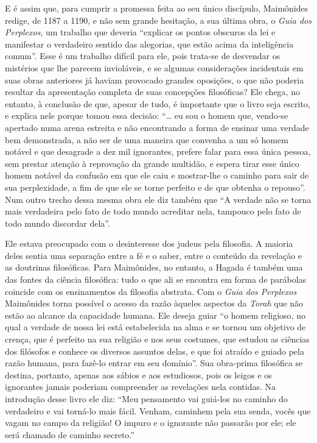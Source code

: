 E é assim que, para cumprir a promessa feita ao seu único discípulo,
Maimônides redige, de 1187 a 1190, e não sem grande hesitação, a sua
última obra, o \emph{Guia dos Perplexos}, um trabalho que deveria
``explicar os pontos obscuros da lei e manifestar o verdadeiro sentido
das alegorias, que estão acima da inteligência comum''. Esse é um
trabalho difícil para ele, pois trata-se de desvendar os mistérios que
lhe parecem invioláveis, e se algumas considerações incidentais em suas
obras anteriores já haviam provocado grandes oposições, o que não
poderia resultar da apresentação completa de suas concepções
filosóficas? Ele chega, no entanto, à conclusão de que, apesar de tudo,
é importante que o livro seja escrito, e explica nele porque tomou essa
decisão: ``\ldots{} eu sou o homem que, vendo-se apertado numa arena estreita
e não encontrando a forma de ensinar uma verdade bem demonstrada, a não
ser de uma maneira que convenha a um só homem notável e que desagrade a
dez mil ignorantes, prefere falar para essa única pessoa, sem prestar
atenção à reprovação da grande multidão, e espera tirar esse único
homem notável da confusão em que ele caiu e mostrar-lhe o caminho para
sair de sua perplexidade, a fim de que ele se torne perfeito e de que
obtenha o repouso''. Num outro trecho dessa mesma obra ele diz também
que ``A verdade não se torna mais verdadeira pelo fato de todo mundo
acreditar nela, tampouco pelo fato de todo mundo discordar dela''.

Ele estava preocupado com o desinteresse dos judeus pela filosofia. A
maioria deles sentia uma separação entre a fé e o saber, entre o
conteúdo da revelação e as doutrinas filosóficas. Para Maimônides, no
entanto, a Hagada é também uma das fontes da ciência filosófica: tudo o
que ali se encontra em forma de parábolas coincide com os ensinamentos
da filosofia abstrata. Com o \emph{Guia dos Perplexos} Maimônides torna
possível o acesso da razão àqueles aspectos da \emph{Torah} que não
estão ao alcance da capacidade humana. Ele deseja guiar ``o homem
religioso, no qual a verdade de nossa lei está estabelecida na alma e se
tornou um objetivo de crença, que é perfeito na sua religião e nos seus
costumes, que estudou as ciências dos filósofos e conhece os diversos
assuntos delas, e que foi atraído e guiado pela razão humana, para
fazê-lo entrar em seu domínio''. Sua obra-prima filosófica se destina,
portanto, apenas aos sábios e aos estudiosos, pois os leigos e os
ignorantes jamais poderiam compreender as revelações nela contidas. Na
introdução desse livro ele diz: ``Meu pensamento vai guiá-los no caminho
do verdadeiro e vai torná-lo mais fácil. Venham, caminhem pela sua
senda, vocês que vagam no campo da religião! O impuro e o ignorante não
passarão por ele; ele será chamado de caminho secreto.''

